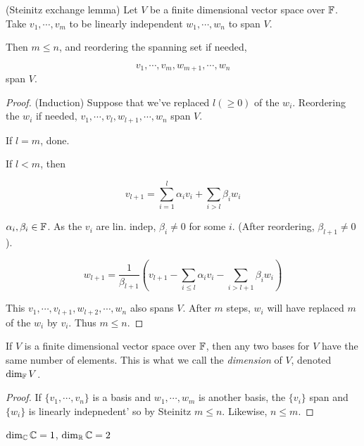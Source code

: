 \documentclass[a4paper]{article}
\begin{document}
\begin{thm} (Steinitz exchange lemma)
	Let $ V $ be a finite dimensional vector space over $ \mathbb{F} $. Take $ v_{1},\cdots,v_{m} $ to be linearly independent $ w_{1},\cdots,w_{n} $ to span $ V $. 
	
	Then $ m \leq n $, and reordering the spanning set if needed,
	
	\[ v_{1},\cdots, v_{m}, w_{m+1},\cdots,w_{n} \] span $ V $.
	
\end{thm}

\begin{proof} (Induction)
	Suppose that we've replaced $ l (\geq 0)$ of the $ w_{i} $. Reordering the $ w_{i} $ if needed, $ v_{1},\cdots,v_{l},w_{l+1},\cdots,w_{n} $ span $ V $. 
	
	If $ l = m $, done.
	
	If $ l < m $, then
	
	\[ v_{l+1} = \sum_{i=1}^{l} \alpha_{i} v_{i}  + \sum_{i > l} \beta_{i} w_{i} \]
	
	$ \alpha_{i}, \beta_{i} \in \mathbb{F} $. As the $ v_{i} $ are lin. indep, $ \beta_{i} \neq 0 $ for some $ i $. (After reordering, $ \beta_{l+1} \neq 0 $).
	
	\[ w_{l+1} = \frac{1}{\beta_{l+1}} \left( v_{l+1} - \sum_{i \leq l} \alpha_{i} v_{i}  - \sum_{i > l+1} \beta_{i} w_{i} \right)  \]
	
	This $ v_{1},\cdots,v_{l+1},w_{l+2},\cdots,w_{n} $ also spans $ V $. After $ m $ steps, $ w_{i} $ will have replaced $ m $ of the $ w_{i} $ by $ v_{i} $. Thus $ m \leq n $.
\end{proof}


\begin{thm} 
	If $ V $ is a finite dimensional vector space over $ \mathbb{F} $, then any two bases for $ V $ have the same number of elements. This is what we call the \emph{dimension} of $ V $, denoted $ \dim_{\mathbb{F}} V $.
\end{thm}

\begin{proof}
	If $ \{  v_{1},\cdots,v_{n} \} $ is a basis and $ w_{1},\cdots,w_{m} $ is another basis, the $ \{ v_{i} \} $ span and $ \{ w_{i} \} $ is linearly indepnedent' so by Steinitz $ m \leq n $. Likewise, $ n \leq m $.
\end{proof}


\begin{eg}
	$ \dim_{\mathbb{C}} \mathbb{C} = 1 $, $ \dim_{\mathbb{R}} \mathbb{C} = 2 $
\end{eg}
\end{document}
